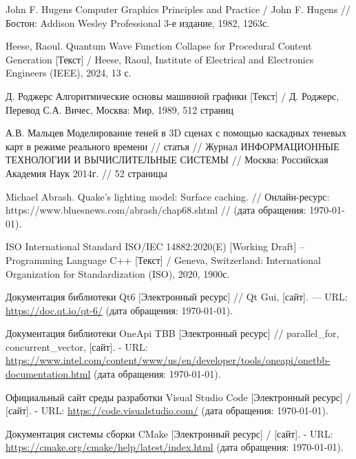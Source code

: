 \begin{thebibliography}{}
   John F. Hugens Computer Graphics Principles and Practice / John F. Hugens // Бостон: Addison Wesley Professional 3-е издание, 1982, 1263с.

   Heese, Raoul. Quantum Wave Function Collapse for Procedural Content Generation [Текст] / Heese, Raoul, Institute of Electrical and Electronics Engineers (IEEE), 2024, 13 с.

   Д. Роджерс Алгоритмические основы машинной графики [Текст] / Д. Роджерс, Перевод С.А. Вичес, Москва: Мир, 1989, 512 страниц 

   А.В. Мальцев Моделирование теней в 3D сценах с помощью каскадных теневых карт в режиме реального времени // статья // Журнал ИНФОРМАЦИОННЫЕ ТЕХНОЛОГИИ И ВЫЧИСЛИТЕЛЬНЫЕ СИСТЕМЫ // Москва: Российская Академия Наук 2014г. // 52 страницы

   Michael Abrash. Quake's lighting model: Surface caching. // Онлайн-ресурс: https://www.bluesnews.com/abrash/chap68.shtml // (дата обращения: \today).

   ISO International Standard ISO/IEC 14882:2020(E) [Working Draft] – Programming Language C++ [Текст] / Geneva, Switzerland: International Organization for Standardization (ISO), 2020, 1900с.

   Документация библиотеки Qt6  [Электронный ресурс] // Qt Gui, [сайт]. — URL: \url{https://doc.qt.io/qt-6/} (дата обращения: \today).

   Документация библиотеки OneApi TBB [Электронный ресурс] // parallel\_for, concurrent\_vector, [сайт]. - URL: \url{https://www.intel.com/content/www/us/en/developer/tools/oneapi/onetbb-documentation.html} (дата обращения: \today).

   Официальный сайт среды разработки Visual Studio Code [Электронный ресурс] / [сайт]. - URL: \url{https://code.visualstudio.com/} (дата обращения: \today).

   Документация системы сборки CMake [Электронный ресурс] / [сайт]. - URL: \url{https://cmake.org/cmake/help/latest/index.html} (дата обращения: \today).



\end{thebibliography}